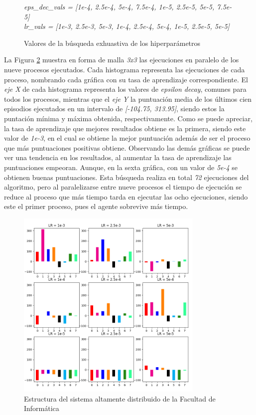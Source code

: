 			\begin{figure}[!h]		
			
			 
				\begin{tcolorbox}[boxrule=0.5pt, fontupper=\small]				
					
					\begin{center}
						\textit{eps\_dec\_vals = [1e-4, 2.5e-4, 5e-4, 7.5e-4, 1e-5, 2.5e-5, 5e-5, 7.5e-5]	\\			
					lr\_vals = [1e-3, 2.5e-3, 5e-3, 1e-4, 2.5e-4, 5e-4, 1e-5, 2.5e-5, 5e-5]	}
					\end{center}			
					
				\end{tcolorbox}
			\caption{Valores de la búsqueda exhuastiva de los hiperparámetros}
			\label{dqn_params}
			\end{figure}
			
			La Figura \ref{fig:dqn_search} muestra en forma de malla \textit{3x3} las ejecuciones en paralelo de los nueve procesos ejecutados. Cada histograma representa las ejecuciones de cada proceso, nombrando cada gráfica con su tasa de aprendizaje correspondiente. El \textit{eje X} de cada histograma representa los valores de \textit{epsilon decay}, comunes para todos los procesos, mientras que el \textit{eje Y} la puntuación media de los últimos cien episodios ejecutados en un intervalo de \textit{[-104.75, 313.95]}, siendo estos la puntación mínima y máxima obtenida, respectivamente. Como se puede apreciar, la tasa de aprendizaje que mejores resultados obtiene es la primera, siendo este valor de \textit{1e-3}, en el cual se obtiene la mejor puntuación además de ser el proceso que más puntuaciones positivas obtiene. Observando las demás gráficas se puede ver una tendencia en los resultados, al aumentar la tasa de aprendizaje las puntuaciones empeoran. Aunque, en la sexta gráfica, con un valor de \textit{5e-4} se obtienen buenas puntuaciones. Esta búsqueda realiza en total \textit{72} ejecuciones del algoritmo, pero al paralelizarse entre nueve procesos el tiempo de ejecución se reduce al proceso que más tiempo tarda en ejecutar las ocho ejecuciones, siendo este el primer proceso, pues el agente sobrevive más tiempo.
			
			
			
			
			\begin{figure}[!h]
				\centering
				\includegraphics[width=0.8\textwidth]{images/chapter_4/DQN_search}
				\caption{Estructura del sistema altamente distribuido de la Facultad de Informática}
				\label{fig:dqn_search}
			\end{figure}
			